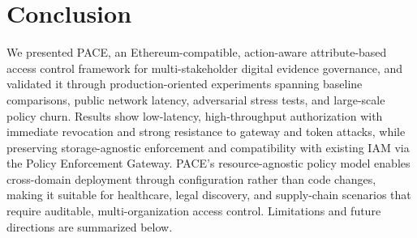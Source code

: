 \documentclass[pdflatex,sn-mathphys-num]{sn-jnl}
\begin{document}
\section{Conclusion}
\label{con}
We presented PACE, an Ethereum-compatible, action-aware attribute-based access control framework for multi-stakeholder digital evidence governance, and validated it through production-oriented experiments spanning baseline comparisons, public network latency, adversarial stress tests, and large-scale policy churn. Results show low-latency, high-throughput authorization with immediate revocation and strong resistance to gateway and token attacks, while preserving storage-agnostic enforcement and compatibility with existing IAM via the Policy Enforcement Gateway. PACE’s resource-agnostic policy model enables cross-domain deployment through configuration rather than code changes, making it suitable for healthcare, legal discovery, and supply-chain scenarios that require auditable, multi-organization access control. Limitations and future directions are summarized below.
\end{document}
